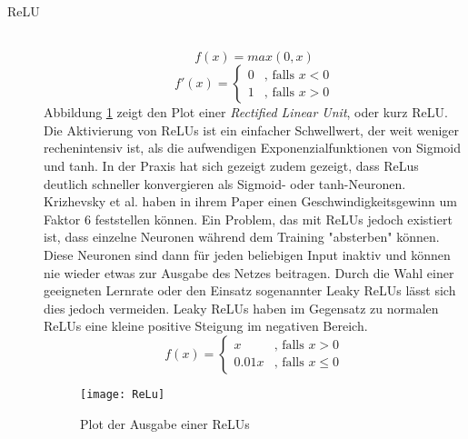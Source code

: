 \begin{description}
	\item[ReLU] \hfill \\
		\begin{equation}
			f(x) = max(0, x)
		\end{equation}
		\begin{equation*}
			f'(x) = \begin{cases}
			0 &\text{, falls $x < 0$}\\
			1 &\text{, falls $x > 0$}
			\end{cases}
		\end{equation*}
		Abbildung \ref{reluoutput} zeigt den Plot einer \textit{Rectified Linear Unit}, oder kurz ReLU.
		Die Aktivierung von ReLUs ist ein einfacher Schwellwert, der weit weniger rechenintensiv ist, als die aufwendigen Exponenzialfunktionen von Sigmoid und tanh.
		In der Praxis hat sich gezeigt zudem gezeigt, dass ReLus deutlich schneller konvergieren als Sigmoid- oder tanh-Neuronen. 
		Krizhevsky et al. haben in ihrem Paper\cite{NIPS2012_4824} einen Geschwindigkeitsgewinn um Faktor 6 feststellen können.
		Ein Problem, das mit ReLUs jedoch existiert ist, dass einzelne Neuronen während dem Training "absterben" können.
		Diese Neuronen sind dann für jeden beliebigen Input inaktiv und können nie wieder etwas zur Ausgabe des Netzes beitragen.
		Durch die Wahl einer geeigneten Lernrate oder den Einsatz sogenannter Leaky ReLUs lässt sich dies jedoch vermeiden.
		Leaky ReLUs haben im Gegensatz zu normalen ReLUs eine kleine positive Steigung im negativen Bereich.
		\begin{equation}
			f(x) = \begin{cases}
				x &\text{, falls } x  >  0\\
				0.01 x &\text{, falls } x  \leq  0
			\end{cases}
		\end{equation} 

		\begin{figure}
			\centering
			\texttt{[image: ReLu]}
			\caption{Plot der Ausgabe einer ReLUs}
			\label{reluoutput}
		\end{figure}



\end{description}


